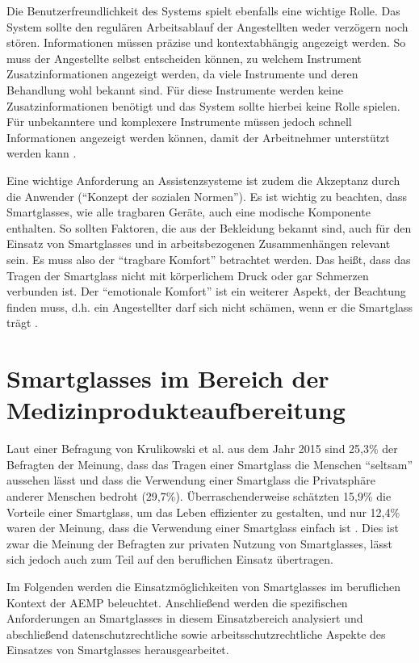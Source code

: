 Die Benutzerfreundlichkeit des Systems spielt ebenfalls eine wichtige Rolle. Das System sollte den regulären Arbeitsablauf der Angestellten weder verzögern noch stören. Informationen müssen präzise und kontextabhängig angezeigt werden. So muss der Angestellte selbst entscheiden können, zu welchem Instrument Zusatzinformationen angezeigt werden, da viele Instrumente und deren Behandlung wohl bekannt sind. Für diese Instrumente werden keine Zusatzinformationen benötigt und das System sollte hierbei keine Rolle spielen. Für unbekanntere und komplexere Instrumente müssen jedoch schnell Informationen angezeigt werden können, damit der Arbeitnehmer unterstützt werden kann \cite[S.~29]{Ruther2014}.

Eine wichtige Anforderung an Assistenzsysteme ist zudem die Akzeptanz durch die Anwender (\enquote{Konzept der sozialen Normen}). Es ist wichtig zu beachten, dass Smartglasses, wie alle tragbaren Geräte, auch eine modische Komponente enthalten. So sollten Faktoren, die aus der Bekleidung bekannt sind, auch für den Einsatz von Smartglasses und in arbeitsbezogenen Zusammenhängen relevant sein. Es muss also der \enquote{tragbare Komfort} betrachtet werden. Das heißt, dass das Tragen der Smartglass nicht mit körperlichem Druck oder gar Schmerzen verbunden ist.  Der \enquote{emotionale Komfort} ist ein weiterer Aspekt, der Beachtung finden muss, d.h. ein Angestellter darf sich nicht schämen, wenn er die Smartglass trägt \cite{Hein2016}.
%
%
%
%
%
%
\section{Smartglasses im Bereich der Medizinprodukteaufbereitung}
\label{sec:Smartglasses_im_Bereich_der_Medizinprodukteaufbereitung}
Laut einer Befragung von Krulikowski et al. aus dem Jahr 2015 \cite{Hein2016} sind 25,3\% der Befragten der Meinung, dass das Tragen einer Smartglass die Menschen \enquote{seltsam} aussehen lässt und dass die Verwendung einer Smartglass die Privatsphäre anderer Menschen bedroht (29,7\%). Überraschenderweise schätzten 15,9\% die Vorteile einer Smartglass, um das Leben effizienter zu gestalten, und nur 12,4\% waren der Meinung, dass die Verwendung einer Smartglass einfach ist \cite{Hein2016}. Dies ist zwar die Meinung der Befragten zur privaten Nutzung von Smartglasses, lässt sich jedoch auch zum Teil auf den beruflichen Einsatz übertragen.

Im Folgenden werden die Einsatzmöglichkeiten von Smartglasses im beruflichen Kontext der AEMP beleuchtet. Anschließend werden die spezifischen Anforderungen an Smartglasses in diesem Einsatzbereich analysiert und abschließend datenschutzrechtliche sowie arbeitsschutzrechtliche Aspekte des Einsatzes von Smartglasses herausgearbeitet. 
%
%
%
%
%
%
